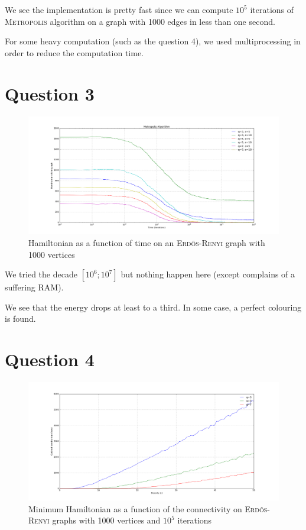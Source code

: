 \documentclass[a4paper, 11pt]{article}
\begin{document}
We see the implementation is pretty fast since we can compute $10^5$ iterations of \textsc{Metropolis} algorithm on a graph with 1000 edges in less than one second.

For some heavy computation (such as the question 4), we used multiprocessing in order to reduce the computation time.

\section{Question 3}

\begin{figure}[!ht]
	\centering
	\includegraphics[width=\textwidth]{figures/q3}
	\caption{Hamiltonian as a function of time on an \textsc{Erd\H{o}s-Renyi} graph with 1000 vertices}
\end{figure}

We tried the decade $[10^6; 10^7]$ but nothing happen here (except complains of a suffering RAM).

We see that the energy drops at least to a third. In some case, a perfect colouring is found.

\FloatBarrier

\section{Question 4}

\begin{figure}[!ht]
	\centering
	\includegraphics[width=\textwidth]{figures/q4}
	\caption{Minimum Hamiltonian as a function of the connectivity on \textsc{Erd\H{o}s-Renyi} graphs with 1000 vertices and $10^5$ iterations}
\end{figure}
\end{document}

